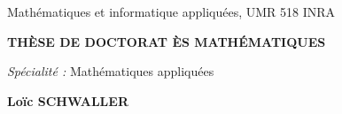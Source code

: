 \documentclass[a4paper,12pt]{article}
\begin{document}
\begin{center}
  Math\'ematiques et informatique appliqu\'ees, UMR 518 INRA\\
  \vspace*{0.2cm}
\end{center}

\vspace{5mm}

\begin{center}
{\Large\bf TH\`ESE DE DOCTORAT \`ES MATH\'EMATIQUES}
\end{center}

\vspace{2mm}

\begin{center}
{\it Sp\'ecialit\'e : } 
{\large Math\'ematiques appliqu\'ees}
\end{center}

\vspace{5mm}

\begin{center}
{\large\bf Lo\"ic SCHWALLER}
\end{center}

\vspace{3mm}
 
\end{document}
